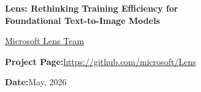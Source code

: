 \documentclass{llmxive}
\providecommand{\msfttitlefont}{\msftsans\bfseries}
\providecommand{\msftmetalabel}[1]{{\msftsans\small\bfseries #1:}\hspace{0.35em}}
\begin{document}
\vspace{1.0em}
\begin{center}
{{\msfttitlefont\fontsize{21}{25}\selectfont
Lens: Rethinking Training Efficiency for \\Foundational Text-to-Image Models\par}}                         %
\vspace{1.25em}




{\normalsize\rmfamily
\hyperref[sec:contributor]{Microsoft Lens Team}\par



}

\end{center}



\vspace{0.45em}
\begin{msfttitlebox}


%






\vspace{0.14cm}
{\small
{\msftmetalabel{Project Page}\href{https://github.com/microsoft/Lens}{https://github.com/microsoft/Lens}\par}
{\msftmetalabel{Date}May, 2026\par}                %
}

\end{msfttitlebox}
\suppressfloats[t]  %

\end{document}

